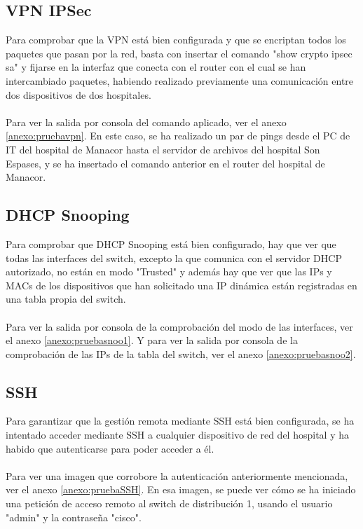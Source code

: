 \subsection{VPN IPSec}
Para comprobar que la VPN está bien configurada y que se encriptan todos los paquetes que pasan por la red, basta con insertar el comando "show crypto ipsec sa" y fijarse en la interfaz que 
conecta con el router con el cual se han intercambiado paquetes, habiendo realizado previamente una comunicación entre dos dispositivos de dos hospitales.
\\ \\ 
Para ver la salida por consola del comando aplicado, ver el anexo \ref{anexo:pruebavpn}. En este caso, se ha realizado un par de pings desde el PC de IT del hospital de Manacor hasta el 
servidor de archivos del hospital Son Espases, y se ha insertado el comando anterior en el router del hospital de Manacor.

\subsection{DHCP Snooping}
Para comprobar que DHCP Snooping está bien configurado, hay que ver que todas las interfaces del switch, excepto la que comunica con el servidor DHCP autorizado, no están en modo 
"Trusted" y además hay que ver que las IPs y MACs de los dispositivos que han solicitado una IP dinámica están registradas en una tabla propia del switch.
\\ \\ 
Para ver la salida por consola de la comprobación del modo de las interfaces, ver el anexo \ref{anexo:pruebasnoo1}. Y para ver la salida por consola de la comprobación de las IPs de la tabla del switch, ver el anexo \ref{anexo:pruebasnoo2}.

\subsection{SSH}
Para garantizar que la gestión remota mediante SSH está bien configurada, se ha intentado acceder mediante SSH a cualquier dispositivo de red del hospital y ha habido que autenticarse para poder acceder a él.
\\ \\ 
Para ver una imagen que corrobore la autenticación anteriormente mencionada, ver el anexo \ref{anexo:pruebaSSH}. En esa imagen, se puede ver cómo se ha iniciado una petición de acceso remoto al switch de distribución 1, usando el usuario "admin" y la contraseña "cisco".

